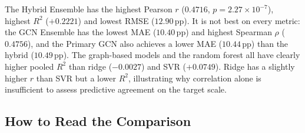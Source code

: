 \documentclass{ieeeaccess}
\newcommand{\pp}{\,\text{pp}}
\begin{document}
\begin{table}[!t]
\caption{Paired Bootstrap Differences (first model minus second; 95\% CI)}
\label{tab:paired}
\centering
\scriptsize
{}
\end{table}

The Hybrid Ensemble has the highest Pearson $r$ ($0.4716$, $p=2.27\times10^{-7}$), highest $R^2$ ($+0.2221$) and lowest RMSE ($12.90\pp$). It is not best on every metric: the GCN Ensemble has the lowest MAE ($10.40\pp$) and highest Spearman $\rho$ ($0.4756$), and the Primary GCN also achieves a lower MAE ($10.44\pp$) than the hybrid ($10.49\pp$). The graph-based models and the random forest all have clearly higher pooled $R^2$ than ridge ($-0.0027$) and SVR ($+0.0749$). Ridge has a slightly higher $r$ than SVR but a lower $R^2$, illustrating why correlation alone is insufficient to assess predictive agreement on the target scale.

\subsection{How to Read the Comparison}
\end{document}

